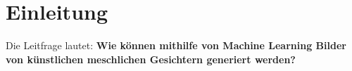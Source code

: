 \documentclass[../main]{subfiles}
\begin{document}
\section{Einleitung}

Die Leitfrage lautet: \textbf{Wie können mithilfe von Machine Learning Bilder von künstlichen meschlichen Gesichtern generiert werden?}
\end{document}
